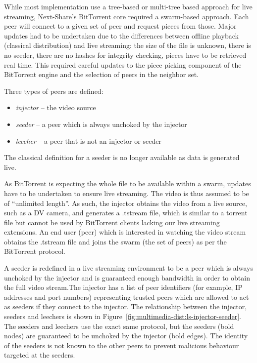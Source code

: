 While most implementation use a tree-based or multi-tree based approach for
live streaming, Next-Share's BitTorrent core required a swarm-based approach.
Each peer will connect to a given set of peer and request pieces from those.
Major updates had to be undertaken due to the differences between offline
playback (classical distribution) and live streaming: the size of the file is
unknown, there is no seeder, there are no hashes for integrity checking,
pieces have to be retrieved real time. This required careful updates to the
piece picking component of the BitTorrent engine and the selection of peers in
the neighbor set.

Three types of peers are defined:
\begin{itemize}
  \item \textit{injector} -- the video source
  \item \textit{seeder} -- a peer which is always unchoked by the injector
  \item \textit{leecher} -- a peer that is not an injector or seeder
\end{itemize}

The classical definition for a seeder is no longer available as data is
generated live.

As BitTorrent is expecting the whole file to be available within a swarm,
updates have to be undertaken to ensure live streaming. The video is thus
assumed to be of ``unlimited length''. As such, the injector obtains the
video from a live source, such as a DV camera, and generates a .tstream file,
which is similar to a torrent file but cannot be used by BitTorrent clients
lacking our live streaming extensions. An end user (peer) which is interested
in watching the video stream obtains the .tstream file and joins the swarm
(the set of peers) as per the BitTorrent protocol.

A seeder is redefined in a live streaming environment to be a peer which is
always unchoked by the injector and is guaranteed enough bandwidth in order to
obtain the full video stream.The injector has a list of peer identifiers (for
example, IP addresses and port numbers) representing trusted peers which are
allowed to act as seeders if they connect to the injector. The relationship
between the injector, seeders and leechers is shown in
Figure~\ref{fig:multimedia-dist:ls-injector-seeder}. The seeders and leechers use the exact
same protocol, but the seeders (bold nodes) are guaranteed to be unchoked by
the injector (bold edges). The identity of the seeders is not known to the
other peers to prevent malicious behaviour targeted at the seeders.


